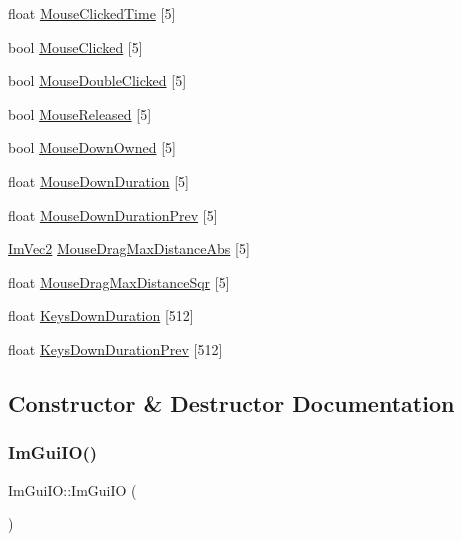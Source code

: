 \begin{DoxyCompactItemize}
\item 
float \hyperlink{struct_im_gui_i_o_a729a9ddda54b9f7d7d640340d56e981b}{Mouse\+Clicked\+Time} \mbox{[}5\mbox{]}
\item 
bool \hyperlink{struct_im_gui_i_o_a8655587202ff9001e5b0ccc6ade42d93}{Mouse\+Clicked} \mbox{[}5\mbox{]}
\item 
bool \hyperlink{struct_im_gui_i_o_a8bc01048733dc554de3d03f40f57b9ca}{Mouse\+Double\+Clicked} \mbox{[}5\mbox{]}
\item 
bool \hyperlink{struct_im_gui_i_o_a3a2e7d52289eecfdbe8571e034e41b53}{Mouse\+Released} \mbox{[}5\mbox{]}
\item 
bool \hyperlink{struct_im_gui_i_o_a682f98d817f99058136cb47cf8a9bcc3}{Mouse\+Down\+Owned} \mbox{[}5\mbox{]}
\item 
float \hyperlink{struct_im_gui_i_o_ab464bf317051bbdf1c93ab36802fe3b7}{Mouse\+Down\+Duration} \mbox{[}5\mbox{]}
\item 
float \hyperlink{struct_im_gui_i_o_a59d19cf7ad831e57ce15f90295871881}{Mouse\+Down\+Duration\+Prev} \mbox{[}5\mbox{]}
\item 
\hyperlink{struct_im_vec2}{Im\+Vec2} \hyperlink{struct_im_gui_i_o_a402bca8838011fc4518c0895f24ffc92}{Mouse\+Drag\+Max\+Distance\+Abs} \mbox{[}5\mbox{]}
\item 
float \hyperlink{struct_im_gui_i_o_a86c7fe77349fd82a60ab7a279aa27f01}{Mouse\+Drag\+Max\+Distance\+Sqr} \mbox{[}5\mbox{]}
\item 
float \hyperlink{struct_im_gui_i_o_a6f1da2ea6d8e3398d9526fe983cf0a6f}{Keys\+Down\+Duration} \mbox{[}512\mbox{]}
\item 
float \hyperlink{struct_im_gui_i_o_ac079dcd415784a08fec74388e18abb97}{Keys\+Down\+Duration\+Prev} \mbox{[}512\mbox{]}
\end{DoxyCompactItemize}


\subsection{Constructor \& Destructor Documentation}
\hypertarget{struct_im_gui_i_o_a0ad8d993e50108b81b0d279d2d43f69d}{}\label{struct_im_gui_i_o_a0ad8d993e50108b81b0d279d2d43f69d} 
\subsubsection{\texorpdfstring{Im\+Gui\+I\+O()}{ImGuiIO()}}
{\footnotesize\ttfamily Im\+Gui\+I\+O\+::\+Im\+Gui\+IO (\begin{DoxyParamCaption}{ }\end{DoxyParamCaption})}



